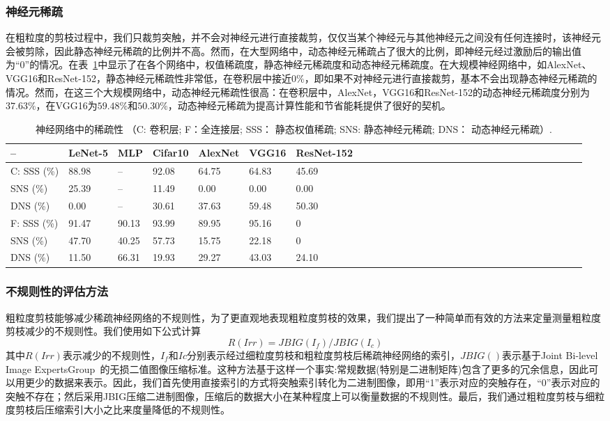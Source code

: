 \subsubsection{神经元稀疏}
在粗粒度的剪枝过程中，我们只裁剪突触，并不会对神经元进行直接裁剪，仅仅当某个神经元与其他神经元之间没有任何连接时，该神经元会被剪除，因此静态神经元稀疏的比例并不高。然而，在大型网络中，动态神经元稀疏占了很大的比例，即神经元经过激励后的输出值为“0”的情况。在表~\ref{tab:sparsities}中显示了在各个网络中，权值稀疏度，静态神经元稀疏度和动态神经元稀疏度。在大规模神经网络中，如AlexNet、VGG16和ResNet-152，静态神经元稀疏性非常低，在卷积层中接近$0\%$，即如果不对神经元进行直接裁剪，基本不会出现静态神经元稀疏的情况。然而，在这三个大规模网络中，动态神经元稀疏性很高：在卷积层中，AlexNet，VGG16和ResNet-152的动态神经元稀疏度分别为$37.63\%$，在VGG16为$59.48\%$和$50.30\%$，动态神经元稀疏为提高计算性能和节省能耗提供了很好的契机。

\begin{table}[h]
\centering
\caption{\footnotesize 神经网络中的稀疏性 （C: 卷积层; F：全连接层; SSS： 静态权值稀疏; SNS: 静态神经元稀疏; DNS： 动态神经元稀疏）.}
\label{tab:sparsities}
\begin{tabular}{@{~}lll@{~}lll@{~}lll@{~}lll@{~}lll@{~}lll@{~}llllllllllll}
\toprule
-- & LeNet-5 & MLP & Cifar10 & AlexNet & VGG16 & ResNet-152 \\
\midrule
C: SSS (\%)& 88.98 	& -- 	& 92.08 & 64.75 & 64.83 & 45.69 \\
   SNS (\%)& 25.39	& -- 	& 11.49 & 0.00 	& 0.00 	& 0.00 \\
   DNS (\%)& 0.00	& -- 	& 30.61 & 37.63	& 59.48 & 50.30 \\
\hline
F: SSS (\%)& 91.47	& 90.13	& 93.99 & 89.95	& 95.16 & 0 \\
   SNS (\%)& 47.70	& 40.25 & 57.73 & 15.75 & 22.18	& 0 \\
   DNS (\%)& 11.50	& 66.31 & 19.93	& 29.27 & 43.03	& 24.10 \\
\bottomrule
\end{tabular}
\end{table}


\subsubsection{不规则性的评估方法}
\label{subsubsec:irregularity}

粗粒度剪枝能够减少稀疏神经网络的不规则性，为了更直观地表现粗粒度剪枝的效果，我们提出了一种简单而有效的方法来定量测量粗粒度剪枝减少的不规则性。我们使用如下公式计算
\begin{equation}
R(Irr) = JBIG(I_f)/JBIG(I_c)
\end{equation}
其中$R(Irr)$表示减少的不规则性，$I_{f}$和$I {c}$分别表示经过细粒度剪枝和粗粒度剪枝后稀疏神经网络的索引，$JBIG()$表示基于Joint Bi-level Image ExpertsGroup~\cite{jbig}的无损二值图像压缩标准。这种方法基于这样一个事实:常规数据(特别是二进制矩阵)包含了更多的冗余信息，因此可以用更少的数据来表示。因此，我们首先使用直接索引的方式将突触索引转化为二进制图像，即用“1”表示对应的突触存在，“0”表示对应的突触不存在；然后采用JBIG压缩二进制图像，压缩后的数据大小在某种程度上可以衡量数据的不规则性。最后，我们通过粗粒度剪枝与细粒度剪枝后压缩索引大小之比来度量降低的不规则性。


